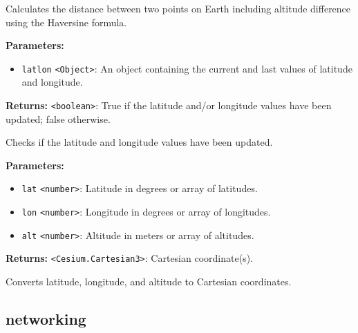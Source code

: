 \documentclass[12pt,a4paper]{article}
\begin{document}
\noindent Calculates the distance between two points on Earth including altitude difference using the Haversine formula.

\vspace{5mm}
\noindent {}


\noindent \textbf{Parameters:}
\begin{itemize}
  \item \texttt{latlon} \texttt{<Object>}: An object containing the current and last values of latitude and longitude.
\end{itemize}

\noindent \textbf{Returns:} \texttt{<boolean>}: True if the latitude and/or longitude values have been updated; false otherwise.

\noindent Checks if the latitude and longitude values have been updated.

\vspace{5mm}
\noindent {}


\noindent \textbf{Parameters:}
\begin{itemize}
  \item \texttt{lat} \texttt{<number>}: Latitude in degrees or array of latitudes.
  \item \texttt{lon} \texttt{<number>}: Longitude in degrees or array of longitudes.
  \item \texttt{alt} \texttt{<number>}: Altitude in meters or array of altitudes.
\end{itemize}

\noindent \textbf{Returns:} \texttt{<Cesium.Cartesian3>}: Cartesian coordinate(s).

\noindent Converts latitude, longitude, and altitude to Cartesian coordinates.


\subsection{networking}
\vspace{5mm}
\noindent {}\vspace{4mm}
\end{document}
